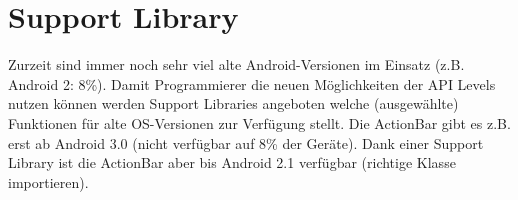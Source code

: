 \section{Support Library}

Zurzeit sind immer noch sehr viel alte Android-Versionen im Einsatz (z.B. Android 2: 8\%). Damit Programmierer die neuen Möglichkeiten der API Levels nutzen können werden Support Libraries angeboten welche (ausgewählte) Funktionen für alte OS-Versionen zur Verfügung stellt. Die ActionBar gibt es z.B. erst ab Android 3.0 (nicht verfügbar auf 8\% der Geräte). Dank einer Support Library ist die ActionBar aber bis Android 2.1 verfügbar (richtige Klasse importieren).